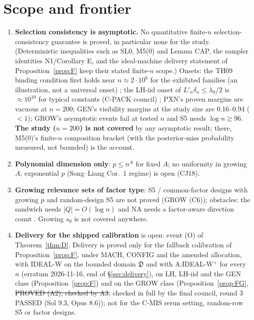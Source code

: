 \section{Scope and frontier}\label{sec:scope}

\begin{notproved}
\begin{enumerate}
\item \textbf{Selection consistency is asymptotic.} No quantitative finite-$n$ selection-consistency guarantee is proved, in particular none for the study. (Deterministic inequalities such as SL0, M5(0) and Lemma CAP, the sampler identities N1/Corollary E, and the ideal-machine delivery statement of Proposition~\ref{prop:F} keep their stated finite-$n$ scope.) Onsets: the TH09 binding condition first holds near $n\approx2\cdot10^6$ for the exhibited families (an illustration, not a universal onset) ; the LH-iid onset of $L'_n\delta_n\le\lambda_0/2$ is $\approx10^{10}$ for typical constants (C-PACK council) ; PXN's proven margins are vacuous at $n=200$; GEN's visibility margins at the study size are 0.16--0.94 ($<1$); GROW's asymptotic events fail at tested $n$ and S5 needs $\log n\gtrsim96$. \textbf{The study ($n=200$) is not covered} by any asymptotic result; there, M5(0)'s finite-$n$ composition bracket (with the posterior-miss probability measured, not bounded) is the account.
\item \textbf{Polynomial dimension only}: $p\le n^A$ for fixed $A$; no uniformity in growing $A$; exponential $p$ (Song--Liang Cor.~1 regime) is open (CJ18).
\item \textbf{Growing relevance sets of factor type}: S5 / common-factor designs with growing $p$ and random-design S5 are not proved (GROW (C6)); obstacles: the sandwich needs $|Q|=O(\log n)$ and NA needs a factor-aware direction count . Growing $s_0$ is not covered anywhere.
\item \textbf{Delivery for the shipped calibration} is open: event (O) of Theorem~\ref{thm:D}. Delivery is proved only for the fallback calibration of Proposition~\ref{prop:F}, under MACH, CONFIG and the amended allocation, with IDEAL-W on the bounded domain $\mathfrak D$ and with A:IDEAL-W$^{+}$ for every $n$ (erratum 2026-11-16, end of §\ref{sec:delivery}), on LH, LH-iid and the GEN class (Proposition~\ref{prop:F}) and on the GROW class (Proposition~\ref{prop:FG}, \st{PROVED (A2), checked by A3}; checked in full by the final council, round 3 PASSED (Sol 9.3, Opus 8.6)); not for the C-MIS rerun setting, random-row S5 or factor designs.

\end{enumerate}
\end{notproved}
